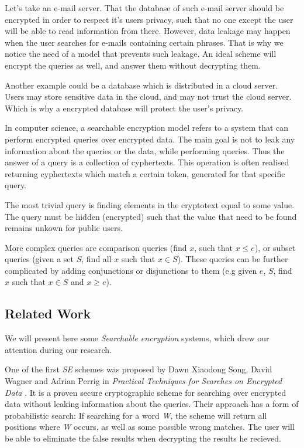 \documentclass[a4paper, 12pt, oneside]{article}
\begin{document}
Let's take an e-mail server. That the database of such e-mail server should be encrypted in order to respect it's users privacy, such that no one except the user will be able to read information from there. However, data leakage may happen when the user searches for e-mails containing certain phrases. That is why we notice the need of a model that prevents such leakage. An ideal scheme will encrypt the queries as well, and answer them without decrypting them.

\bigskip
Another example could be a database which is distributed in a cloud server. Users may store sensitive data in the cloud, and may not trust the cloud server. Which is why a encrypted database will protect the user's privacy. 

\bigskip
In computer science, a searchable encryption model refers to a system that can perform encrypted queries over encrypted data. The main goal is not to leak any information about the queries or the data, while performing queries. Thus the answer of a query is a collection of cyphertexts. This operation is often realised returning cyphertexts which match a certain token, generated for that specific query.

\bigskip

The most trivial query is finding elements in the cryptotext equal to some value. The query must be hidden (encrypted) such that the value that need to be found remains unkown for public users. 


More complex queries are comparison queries (find $x$, such that $x \leq e$), or subset queries (given a set $S$, find all $x$ such that $x \in S$).
These queries can be further complicated by adding conjunctions or disjunctions to them (e.g given $e$, $S$, find $x$ such that $x \in S$ and $x \geq e$).


\subsection{Related Work}

We will present here some \textit{Searchable encryption} systems, which drew our attention during our research. 

\bigskip
	One of the first \textit{SE} schemes was proposed by Dawn Xiaodong Song, David Wagner and Adrian Perrig in \textit{Practical Techniques for Searches on Encrypted Data} \cite{SoWP}. It is a proven secure cryptographic scheme for searching over encrypted data without leaking information about the queries. Their approach has a form of probabilistic search: If searching for a word \textit{W}, the scheme will return all positions where \textit{W} occurs, as well as some possible wrong matches. The user will be able to eliminate the false results when decrypting the results he recieved.
	
\end{document}
